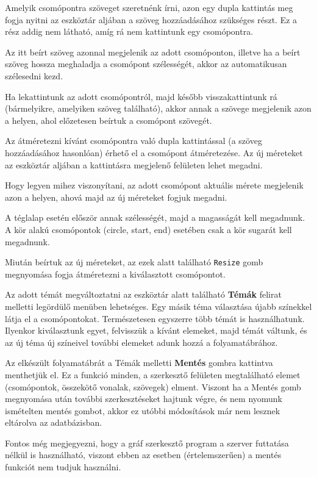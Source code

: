 
Amelyik csomópontra szöveget szeretnénk írni, azon egy dupla kattintás meg fogja nyitni az eszköztár aljában a szöveg hozzáadásához szükséges részt. Ez a rész addig nem látható, amíg rá nem kattintunk egy csomópontra.

Az itt beírt szöveg azonnal megjelenik az adott csomóponton, illetve ha a beírt szöveg hossza meghaladja a csomópont szélességét, akkor az automatikusan szélesedni kezd.

Ha lekattintunk az adott csomópontról, majd később visszakattintunk rá (bármelyikre, amelyiken szöveg található), akkor annak a szövege megjelenik azon a helyen, ahol előzetesen beírtuk a csomópont szövegét.


Az átméretezni kívánt csomópontra való dupla kattintással (a szöveg hozzáadásához hasonlóan) érhető el a csomópont átméretezése. Az új méreteket az eszköztár aljában a kattintásra megjelenő felületen lehet megadni.

Hogy legyen mihez viszonyítani, az adott csomópont aktuális mérete megjelenik azon a helyen, ahová majd az új méreteket fogjuk megadni.

A téglalap esetén először annak szélességét, majd a magasságát kell megadnunk. A kör alakú csomópontok (circle, start, end) esetében csak a kör sugarát kell megadnunk.

Miután beírtuk az új méreteket, az ezek alatt található \texttt{Resize} gomb megnyomása fogja átméretezni a kiválasztott csomópontot.


Az adott témát megváltoztatni az eszköztár alatt található \textbf{Témák} felirat melletti legördülő menüben lehetséges. Egy másik téma választása újabb színekkel látja el a csomópontokat. Természetesen egyszerre több témát is használhatunk. Ilyenkor kiválasztunk egyet, felvisszük a kívánt elemeket, majd témát váltunk, és az új téma új színeivel további elemeket adunk hozzá a folyamatábrához.


Az elkészült folyamatábrát a Témák melletti \textbf{Mentés} gombra kattintva menthetjük el. Ez a funkció minden, a szerkesztő felületen megtalálható elemet (csomópontok, összekötő vonalak, szövegek) elment. Viszont ha a Mentés gomb megnyomása után további szerkesztéseket hajtunk végre, és nem nyomunk ismételten mentés gombot, akkor ez utóbbi módosítások már nem lesznek eltárolva az adatbázisban.

Fontos még megjegyezni, hogy a gráf szerkesztő program a szerver futtatása nélkül is használható, viszont ebben az esetben (értelemszerűen) a mentés funkciót nem tudjuk használni.